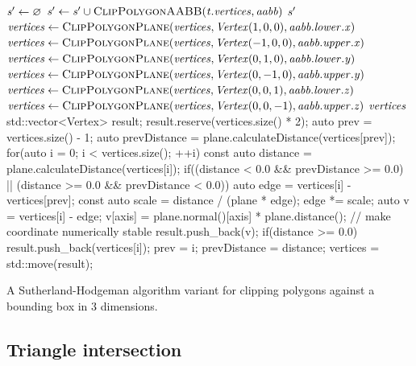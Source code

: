 \begin{algorithm}
	\centering
	\begin{algorithmic}[1]
			\State $\mathit{s'} \gets \varnothing$
				\State $\var{s'} \gets \var{s'} \cup \Call{ClipPolygonAABB}{\var{t.vertices}, \var{aabb}}$
			\EndFor
			\State \Return $\mathit{s'}$
		\EndFunction
		\\
			\State $\var{vertices} \gets \Call{ClipPolygonPlane}{\var{vertices}, \var{Vertex}( 1, 0, 0), \var{aabb.lower.x}}$
			\State $\var{vertices} \gets \Call{ClipPolygonPlane}{\var{vertices}, \var{Vertex}(-1, 0, 0), \var{aabb.upper.x}}$
			\State $\var{vertices} \gets \Call{ClipPolygonPlane}{\var{vertices}, \var{Vertex}( 0, 1, 0), \var{aabb.lower.y}}$
			\State $\var{vertices} \gets \Call{ClipPolygonPlane}{\var{vertices}, \var{Vertex}( 0,-1, 0), \var{aabb.upper.y}}$
			\State $\var{vertices} \gets \Call{ClipPolygonPlane}{\var{vertices}, \var{Vertex}( 0, 0, 1), \var{aabb.lower.z}}$
			\State $\var{vertices} \gets \Call{ClipPolygonPlane}{\var{vertices}, \var{Vertex}( 0, 0,-1), \var{aabb.upper.z}}$
			\State \Return $\mathit{vertices}$
		\EndFunction
		\\
			std::vector<Vertex> result;
			result.reserve(vertices.size() * 2);
			auto prev = vertices.size() - 1;
			auto prevDistance = plane.calculateDistance(vertices[prev]);
			for(auto i = 0; i < vertices.size(); ++i) {
				const auto distance = plane.calculateDistance(vertices[i]);
				if((distance < 0.0 && prevDistance >= 0.0) || (distance >= 0.0 && prevDistance < 0.0)) {
					auto edge = vertices[i] - vertices[prev];
					const auto scale = distance / (plane * edge);
					edge *= scale;
					auto v = vertices[i] - edge;
					v[axis] = plane.normal()[axis] * plane.distance(); // make coordinate numerically stable
					result.push_back(v);
				}
				if(distance >= 0.0) result.push_back(vertices[i]);
				prev = i;
				prevDistance = distance;
			}
			vertices = std::move(result);
		\EndFunction
	\end{algorithmic}
	\caption{
		A Sutherland-Hodgeman algorithm variant for clipping polygons against a bounding box in 3 dimensions.
	}
	\label{alg:clip}
\end{algorithm}



\subsection{Triangle intersection}
\label{sec:triangle_intersection}
	
